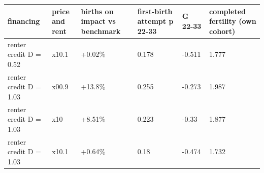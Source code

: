 \begingroup\small
\setlength{\tabcolsep}{3pt}
\renewcommand{\arraystretch}{1.04}
\begin{tabularx}{\linewidth}{XXXXXX}
\toprule
financing & price and rent & births on impact vs benchmark & first-birth attempt p 22-33 & G 22-33 & completed fertility (own cohort) \\
\midrule
renter credit D = 0.52 & x10.1 & +0.02\% & 0.178 & -0.511 & 1.777 \\
renter credit D = 1.03 & x00.9 & +13.8\% & 0.255 & -0.273 & 1.987 \\
renter credit D = 1.03 & x10 & +8.51\% & 0.223 & -0.33 & 1.877 \\
renter credit D = 1.03 & x10.1 & +0.64\% & 0.18 & -0.474 & 1.732 \\
\bottomrule
\end{tabularx}
\endgroup
